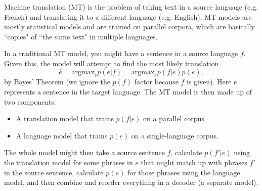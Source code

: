 Machine translation (MT) is the problem of taking text in a source language (e.g. French) and translating it to a different language (e.g. English). MT models are mostly statistical models and are trained on parallel corpora, which are basically ``copies" of ``the same text" in multiple languages.

In a traditional MT model, you might have a sentence in a source language $f$. Given this, the model will attempt to find the most likely translation
$$\hat{e} = \text{argmax}_e p(e | f) = \text{argmax}_e p(f|e)p(e),$$
by Bayes' Theorem (we ignore the $p(f)$ factor because $f$ is given). Here $e$ represents a sentence in the target language. The MT model is then made up of two components:
\begin{itemize}
\item A translation model that trains $p(f|e)$ on a parallel corpus
\item A language model that trains $p(e)$ on a single-language corpus.
\end{itemize}
The whole model might then take a source sentence $f$, calculate $p(f'|e)$ using the translation model for some phrases in $e$ that might match up with phrases $f'$ in the source sentence, calculate $p(e)$ for those phrases using the language model, and then combine and reorder everything in a decoder (a separate model).

